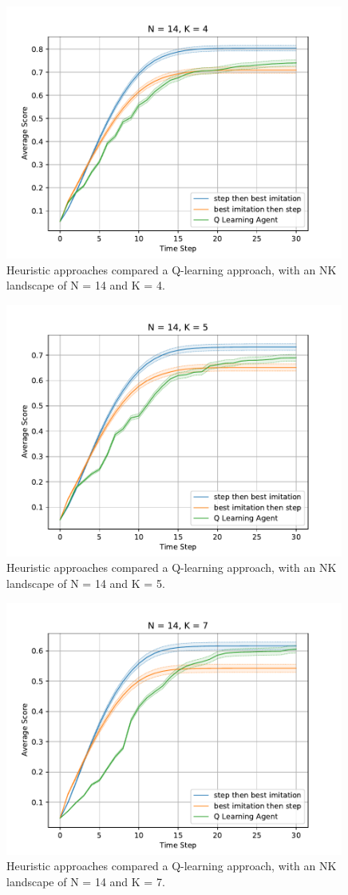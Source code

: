 \documentclass[a4paper]{article}
\begin{document}
\begin{figure}
\centering
\includegraphics[width=30em]{../figures/comp4.pdf}
\caption{
    Heuristic approaches compared a Q-learning approach,
    with an NK landscape of N = 14 and K = 4.
}
\label{comp4}
\end{figure}

\begin{figure}
\centering
\includegraphics[width=30em]{../figures/comp5.pdf}
\caption{
    Heuristic approaches compared a Q-learning approach,
    with an NK landscape of N = 14 and K = 5.
}
\label{comp5}
\end{figure}

\begin{figure}
\centering
\includegraphics[width=30em]{../figures/comp7.pdf}
\caption{
    Heuristic approaches compared a Q-learning approach,
    with an NK landscape of N = 14 and K = 7.
}
\label{comp7}
\end{figure}
\end{document}
